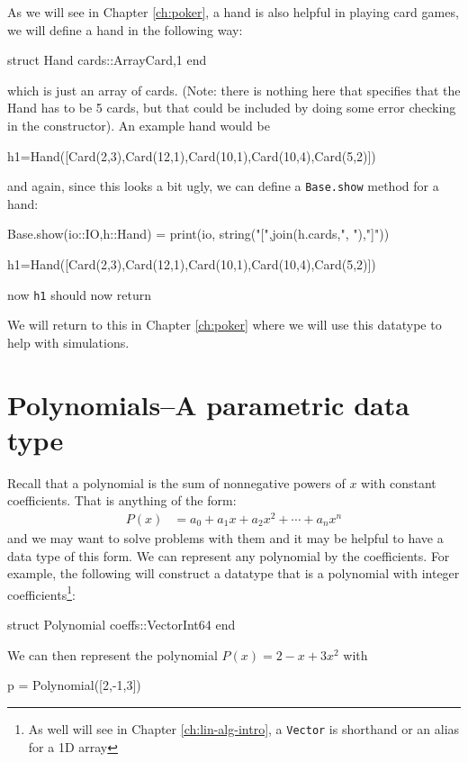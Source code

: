 As we will see in Chapter \ref{ch:poker}, a hand is also helpful in playing card games, we will define a hand in the following way:
%
\begin{jlblock}[newtype]
struct Hand
    cards::Array{Card,1}
end
\end{jlblock}
%
which is just an array of cards. (Note: there is nothing here that
specifies that the Hand has to be 5 cards, but that could be included by
doing some error checking in the constructor).  An example hand would be 
%
\begin{jlblock}[newtype]
h1=Hand([Card(2,3),Card(12,1),Card(10,1),Card(10,4),Card(5,2)])
\end{jlblock}
%
and again, since this looks a bit ugly, we can define a \verb!Base.show! method
for a hand:
%
\begin{jlblock}[newtype]
Base.show(io::IO,h::Hand) = print(io, string("[",join(h.cards,", "),"]"))
\end{jlblock}
\begin{jlcode}[newtype]
h1=Hand([Card(2,3),Card(12,1),Card(10,1),Card(10,4),Card(5,2)])
\end{jlcode}
%
now \texttt{h1} should now return  \printpythontex[verbatim]

We will return to this in Chapter \ref{ch:poker} where we will use this datatype to help with simulations.  


\section{Polynomials--A parametric data type}\label{sect:parametric-types}

Recall that a polynomial is the sum of nonnegative powers of $x$ with constant coefficients.  That is anything of the form:
\begin{align*}
P(x) & = a_0 + a_1 x + a_2 x^2 + \cdots + a_n x^n 
\end{align*}
and we may want to solve problems with them and it may be helpful to have a data type of this form.  We can represent any polynomial by the coefficients.  For example, the following will construct a datatype that is a polynomial with integer coefficients\footnote{As well will see in Chapter \ref{ch:lin-alg-intro}, a \texttt{Vector} is shorthand or an alias for a 1D array}: 
\begin{jlverbatim}[poly]
struct Polynomial
  coeffs::Vector{Int64}
end
\end{jlverbatim}

We can then represent the polynomial $P(x) = 2-x+3x^2$ with
\begin{jlverbatim}[poly]
p = Polynomial([2,-1,3])
\end{jlverbatim}

